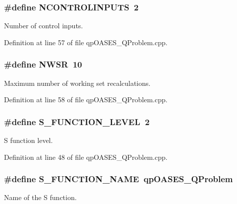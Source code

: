 \subsubsection[{NCONTROLINPUTS}]{\setlength{\rightskip}{0pt plus 5cm}\#define NCONTROLINPUTS~2}\label{qpOASES__QProblem_8cpp_ab559b6bb26aeb10ecdf5654acc204535}
Number of control inputs. 

Definition at line 57 of file qpOASES\_\-QProblem.cpp.

\subsubsection[{NWSR}]{\setlength{\rightskip}{0pt plus 5cm}\#define NWSR~10}\label{qpOASES__QProblem_8cpp_ad4a923bb7993bc9620756fd92bc2cf57}
Maximum number of working set recalculations. 

Definition at line 58 of file qpOASES\_\-QProblem.cpp.

\subsubsection[{S\_\-FUNCTION\_\-LEVEL}]{\setlength{\rightskip}{0pt plus 5cm}\#define S\_\-FUNCTION\_\-LEVEL~2}\label{qpOASES__QProblem_8cpp_a9a4ab27953070e39249f3fad28e93749}
S function level. 

Definition at line 48 of file qpOASES\_\-QProblem.cpp.

\subsubsection[{S\_\-FUNCTION\_\-NAME}]{\setlength{\rightskip}{0pt plus 5cm}\#define S\_\-FUNCTION\_\-NAME~qpOASES\_\-QProblem}\label{qpOASES__QProblem_8cpp_a0f61df833e166c743295eebf43f0b142}
Name of the S function. 

